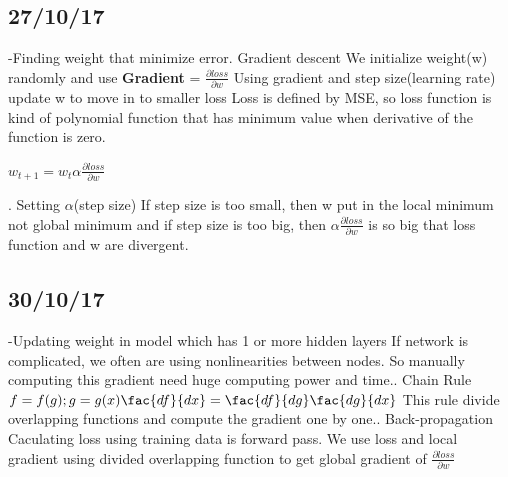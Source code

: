 \documentclass{article}
\begin{document}
\begin{CJK}{UTF8}{}
 
 
\subsection{27/10/17}
-Finding weight that minimize error. Gradient descent\newline
We initialize weight(w) randomly and use \textbf{Gradient} = $\frac{\partial loss}{\partial w}$\newline
Using gradient and step size(learning rate) update w to move in to smaller loss \newline
Loss is defined by MSE, so loss function is kind of polynomial function that has minimum value when derivative of the function is zero.\newline
\begin{center}
$w_{t+1} = w_{t}\alpha \frac{\partial loss}{\partial w}$
 \end{center}. Setting $\alpha$(step size)\newline
If step size is too small, then w put in the local minimum not global minimum and if step size is too big, then $\alpha \frac{\partial loss}{\partial w}$ is so big that loss function and w are divergent.\newline



\subsection{30/10/17}
-Updating weight in model which has 1 or more hidden layers\newline
If network is complicated, we often are using nonlinearities between nodes. So manually computing this gradient need huge computing power and time.. Chain Rule\newline
$f = f(g); g = g(x) \newline
\fac{df}{dx} = \fac{df}{dg}\fac{dg}{dx}$\newline
This rule divide overlapping functions and compute the gradient one by one.. Back-propagation\newline
Caculating loss using training data is forward pass. We use loss and local gradient using divided overlapping function to get global gradient of $\frac{\partial loss}{\partial w}$\newline




\end{CJK}
\end{document}
